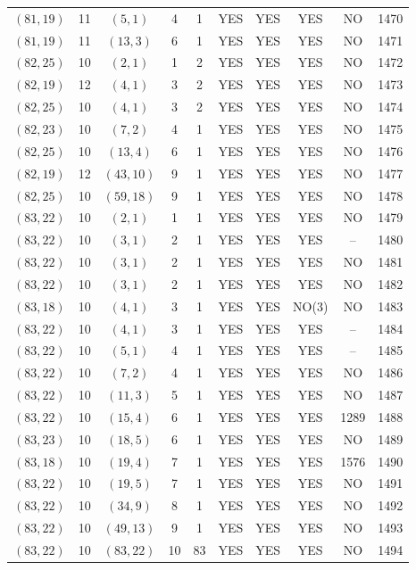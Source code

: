 \begin{longtable}{|c|c|c|c|c|c|c|c|c|c|}
$(81, 19)$ & 11 & $(5, 1)$ & 4 & 1 & YES & YES & YES & NO & 1470\\
$(81, 19)$ & 11 & $(13, 3)$ & 6 & 1 & YES & YES & YES & NO & 1471\\
$(82, 25)$ & 10 & $(2, 1)$ & 1 & 2 & YES & YES & YES & NO & 1472\\
$(82, 19)$ & 12 & $(4, 1)$ & 3 & 2 & YES & YES & YES & NO & 1473\\
$(82, 25)$ & 10 & $(4, 1)$ & 3 & 2 & YES & YES & YES & NO & 1474\\
$(82, 23)$ & 10 & $(7, 2)$ & 4 & 1 & YES & YES & YES & NO & 1475\\
$(82, 25)$ & 10 & $(13, 4)$ & 6 & 1 & YES & YES & YES & NO & 1476\\
$(82, 19)$ & 12 & $(43, 10)$ & 9 & 1 & YES & YES & YES & NO & 1477\\
$(82, 25)$ & 10 & $(59, 18)$ & 9 & 1 & YES & YES & YES & NO & 1478\\
$(83, 22)$ & 10 & $(2, 1)$ & 1 & 1 & YES & YES & YES & NO & 1479\\
$(83, 22)$ & 10 & $(3, 1)$ & 2 & 1 & YES & YES & YES & -- & 1480\\
$(83, 22)$ & 10 & $(3, 1)$ & 2 & 1 & YES & YES & YES & NO & 1481\\
$(83, 22)$ & 10 & $(3, 1)$ & 2 & 1 & YES & YES & YES & NO & 1482\\
$(83, 18)$ & 10 & $(4, 1)$ & 3 & 1 & YES & YES & NO(3) & NO & 1483\\
$(83, 22)$ & 10 & $(4, 1)$ & 3 & 1 & YES & YES & YES & -- & 1484\\
$(83, 22)$ & 10 & $(5, 1)$ & 4 & 1 & YES & YES & YES & -- & 1485\\
$(83, 22)$ & 10 & $(7, 2)$ & 4 & 1 & YES & YES & YES & NO & 1486\\
$(83, 22)$ & 10 & $(11, 3)$ & 5 & 1 & YES & YES & YES & NO & 1487\\
$(83, 22)$ & 10 & $(15, 4)$ & 6 & 1 & YES & YES & YES & 1289 & 1488\\
$(83, 23)$ & 10 & $(18, 5)$ & 6 & 1 & YES & YES & YES & NO & 1489\\
$(83, 18)$ & 10 & $(19, 4)$ & 7 & 1 & YES & YES & YES & 1576 & 1490\\
$(83, 22)$ & 10 & $(19, 5)$ & 7 & 1 & YES & YES & YES & NO & 1491\\
$(83, 22)$ & 10 & $(34, 9)$ & 8 & 1 & YES & YES & YES & NO & 1492\\
$(83, 22)$ & 10 & $(49, 13)$ & 9 & 1 & YES & YES & YES & NO & 1493\\
$(83, 22)$ & 10 & $(83, 22)$ & 10 & 83 & YES & YES & YES & NO & 1494\\

\end{longtable}
